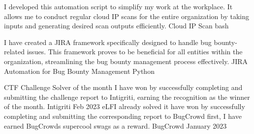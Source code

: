 \documentclass[]{awesome-cv}
\begin{document}
\vspace{-7mm}
\begin{cventries}
	\cventry
	{I developed this automation script to simplify my work at the workplace. It allows me to conduct regular cloud IP scans for the entire organization by taking inputs and generating desired scan outputs efficiently.}
	{Cloud IP Scan}
	{bash}
	{}
	{}
	
	\vspace{-5mm}
	\cventry
	{I have created a JIRA framework specifically designed to handle bug bounty-related issues. This framework proves to be beneficial for all entities within the organization, streamlining the bug bounty management process effectively.}
	{JIRA Automation for Bug Bounty Management}
	{Python}
	{}
	{}
	
	\vspace{-5mm}
\end{cventries}
\begin{cvhonors}
	\cvhonor
	{CTF Challenge Solver of the month}
	{I have won by successfully completing and submitting the challenge report to Intigriti, earning the recognition as the winner of the month.}
	{Intigriti}
	{Feb 2023}
	\cvhonor
	{eLFI already solved it}
	{have won by successfully completing and submitting the corresponding report to BugCrowd first, I have earned BugCrowd\textquotesingle{}s supercool swags as a reward.}
	{BugCrowd}
	{January 2023}
\end{cvhonors}
\ 
\end{document}
